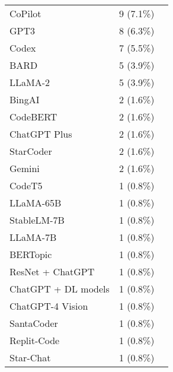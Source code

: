 \begin{table}[ht]
\begin{tabular}{l c p{4cm}}
		CoPilot & 9 (7.1\%) & \cite{arora2024analyzing,bien2024generative,cambaz2024use,denny2023conversing,lau2023ban,prather2023robots,rasnayaka2024empirical,tanay2024exploratory,venkatesh2023evaluating} \\
		GPT3 & 8 (6.3\%) & \cite{balse2023investigating,cao2023scaffolding,cipriano2023gpt3,cipriano2024llms,li2023potential,liffiton2024codehelp,prakash2024integrating,prather2023robots} \\
		Codex & 7 (5.5\%) & \cite{cambaz2024use,drori2023human,kazemitabaar2023studying,kazemitabaar2024novices,macneil2023experiences,nguyen2024beginning,sarsa2022automatic} \\
		BARD & 5 (3.9\%) & \cite{agarwal2024which,cambaz2024use,cipriano2024llms,dengel2023qualitative,estevezayres2024evaluation} \\
		LLaMA-2 & 5 (3.9\%) & \cite{oli2024automated,padiyath2024insights,prakash2024integrating,raihan2024cseprompts,xiao2024qacp} \\
		BingAI & 2 (1.6\%) & \cite{arora2024analyzing,kruger2024performance} \\
		CodeBERT & 2 (1.6\%) & \cite{oli2024automated,wan2024automated} \\
		ChatGPT Plus & 2 (1.6\%) & \cite{padiyath2024insights,rasnayaka2024empirical} \\
		StarCoder & 2 (1.6\%) & \cite{babe2023studenteval,raihan2024cseprompts} \\
		Gemini & 2 (1.6\%) & \cite{arora2024analyzing,xiao2024qacp} \\
		CodeT5 & 1 (0.8\%) & \cite{koutcheme2023training} \\
		LLaMA-65B & 1 (0.8\%) & \cite{kruger2024performance} \\
		StableLM-7B & 1 (0.8\%) & \cite{kruger2024performance} \\
		LLaMA-7B & 1 (0.8\%) & \cite{kruger2024performance} \\
		BERTopic & 1 (0.8\%) & \cite{sterbini2024automated} \\
		ResNet + ChatGPT & 1 (0.8\%) & \cite{wang2024enhancing} \\
		ChatGPT + DL models & 1 (0.8\%) & \cite{hoq2024detecting} \\
		ChatGPT-4 Vision & 1 (0.8\%) & \cite{mendoncca2024evaluating} \\
		SantaCoder & 1 (0.8\%) & \cite{babe2023studenteval} \\
		Replit-Code & 1 (0.8\%) & \cite{babe2023studenteval} \\
		Star-Chat & 1 (0.8\%) & \cite{babe2023studenteval} \\

\end{tabular}
\end{table}
